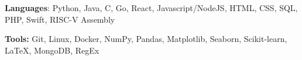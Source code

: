\documentclass{article}
\begin{document}

\begin{adjustwidth}{1em}{1em}

    \textbf{Languages}: Python, Java, C, Go, React, Javascript/NodeJS, HTML, CSS, SQL, PHP, Swift, RISC-V Assembly

    \vspace{1mm}

    \textbf{Tools:} Git, Linux, Docker, NumPy, Pandas, Matplotlib, Seaborn, Scikit-learn, \LaTeX, MongoDB, RegEx

\end{adjustwidth}


\end{document}

